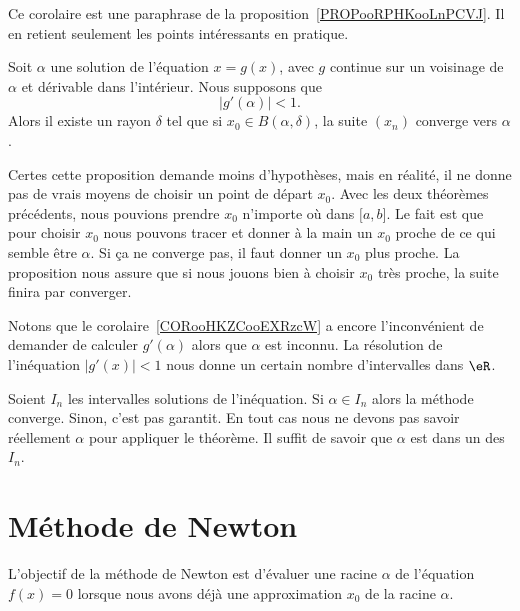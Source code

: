 Ce corolaire est une paraphrase de la proposition~\ref{PROPooRPHKooLnPCVJ}. Il en retient seulement les points intéressants en pratique.

\begin{corollary}     \label{CORooHKZCooEXRzcW}
    Soit \( \alpha\) une solution de l'équation \( x=g(x)\), avec \( g\) continue sur un voisinage de \( \alpha\) et dérivable dans l'intérieur. Nous supposons que
    \begin{equation}
        | g'(\alpha) |<1.
    \end{equation}
    Alors il existe un rayon \( \delta\) tel que si \( x_0\in B(\alpha,\delta)\), la suite \( (x_n)\) converge vers \( \alpha\).
\end{corollary}

Certes cette proposition demande moins d'hypothèses, mais en réalité, il ne donne pas de vrais moyens de choisir un point de départ \( x_0\). Avec les deux théorèmes précédents, nous pouvions prendre \( x_0\) n'importe où dans \( \mathopen[ a , b \mathclose]\). Le fait est que pour choisir \( x_0\) nous pouvons tracer et donner à la main un \( x_0\) proche de ce qui semble être \( \alpha\). Si ça ne converge pas, il faut donner un \(x_0\) plus proche. La proposition nous assure que si nous jouons bien à choisir \( x_0\) très proche, la suite finira par converger.

Notons que le corolaire~\ref{CORooHKZCooEXRzcW} a encore l'inconvénient de demander de calculer \( g'(\alpha)\) alors que \( \alpha\) est inconnu. La résolution de l'inéquation \( | g'(x) |<1\) nous donne un certain nombre d'intervalles dans \( \eR\).

Soient \( I_n\) les intervalles solutions de l'inéquation.  Si \( \alpha\in I_n\) alors la méthode converge. Sinon, c'est pas garantit. En tout cas nous ne devons pas savoir réellement \( \alpha\) pour appliquer le théorème. Il suffit de savoir que \( \alpha\) est dans un des \( I_n\).

\section{Méthode de Newton}
\label{SECooIKXNooACLljs}

L'objectif de la méthode de Newton est d'évaluer une racine \( \alpha\) de l'équation \( f(x)=0\) lorsque nous avons déjà une approximation \( x_0\) de la racine \( \alpha\).

